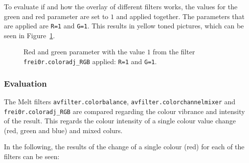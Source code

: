 \documentclass[../MasterThesis.tex]{subfiles}
\begin{document}
To evaluate if and how the overlay of different filters works, the values for the green and red parameter are set to $1$ and applied together. The parameters that are applied are \texttt{R=1} and \texttt{G=1}. This results in yellow toned pictures, which can be seen in Figure~\ref{figure:rg}.


\begin{figure}[H]
	\begin{center}
		\label{figure:rg}
		\caption[Red and green parameter set to $1$ with \texttt{frei0r.coloradj\_RGB}.]{Red and green parameter with the value $1$ from the filter \texttt{frei0r.coloradj\_RGB} applied: \texttt{R=1} and \texttt{G=1}.}
	\end{center}
\end{figure}




\subsubsection*{Evaluation}




The Melt filters \texttt{avfilter.colorbalance}, \texttt{avfilter\-.colorchannelmixer} and \texttt{frei\-0r\-.coloradj\_RGB} are compared regarding the colour vibrance and intensity of the result. This regards the colour intensity of a single colour value change (red, green and blue) and mixed colurs.


In the following, the results of the change of a single colour (red) for each of the filters can be seen:
\end{document}
